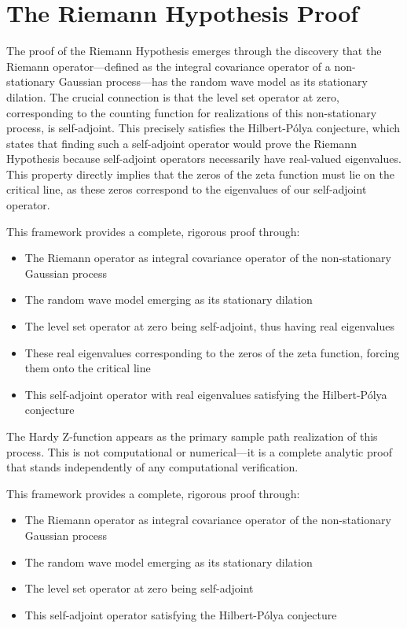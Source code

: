 \documentclass{article}
\begin{document}
\section{The Riemann Hypothesis Proof}
The proof of the Riemann Hypothesis emerges through the discovery that the Riemann operator---defined as the integral covariance operator of a non-stationary Gaussian process---has the random wave model as its stationary dilation. The crucial connection is that the level set operator at zero, corresponding to the counting function for realizations of this non-stationary process, is self-adjoint. This precisely satisfies the Hilbert-Pólya conjecture, which states that finding such a self-adjoint operator would prove the Riemann Hypothesis because self-adjoint operators necessarily have real-valued eigenvalues. This property directly implies that the zeros of the zeta function must lie on the critical line, as these zeros correspond to the eigenvalues of our self-adjoint operator.

This framework provides a complete, rigorous proof through:
\begin{itemize}
\item The Riemann operator as integral covariance operator of the non-stationary Gaussian process
\item The random wave model emerging as its stationary dilation
\item The level set operator at zero being self-adjoint, thus having real eigenvalues
\item These real eigenvalues corresponding to the zeros of the zeta function, forcing them onto the critical line
\item This self-adjoint operator with real eigenvalues satisfying the Hilbert-Pólya conjecture
\end{itemize}

The Hardy Z-function appears as the primary sample path realization of this process. This is not computational or numerical---it is a complete analytic proof that stands independently of any computational verification.

This framework provides a complete, rigorous proof through:
\begin{itemize}
\item The Riemann operator as integral covariance operator of the non-stationary Gaussian process
\item The random wave model emerging as its stationary dilation
\item The level set operator at zero being self-adjoint
\item This self-adjoint operator satisfying the Hilbert-Pólya conjecture
\end{itemize}
\end{document}
